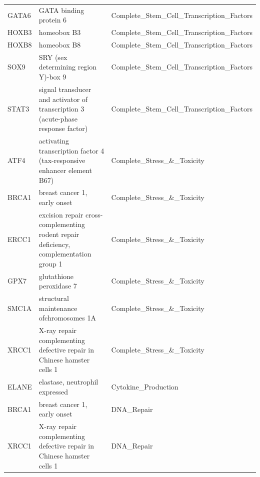 \documentclass[11pt]{article}
\begin{document}
\begin{table}[H]
{\begin{tabular}{|l|l|l|}
    GATA6  & GATA binding protein 6                                                                & Complete\_Stem\_Cell\_Transcription\_Factors \\
    HOXB3  & homeobox B3                                                                           & Complete\_Stem\_Cell\_Transcription\_Factors \\
    HOXB8  & homeobox B8                                                                           & Complete\_Stem\_Cell\_Transcription\_Factors \\
    SOX9   & SRY (sex determining region Y)-box 9                                                  & Complete\_Stem\_Cell\_Transcription\_Factors \\
    STAT3  & signal transducer and activator of transcription 3 (acute-phase response factor)      & Complete\_Stem\_Cell\_Transcription\_Factors \\
    ATF4   & activating transcription factor 4 (tax-responsive enhancer element B67)               & Complete\_Stress\_\&\_Toxicity           \\
    BRCA1  & breast cancer 1, early onset                                                          & Complete\_Stress\_\&\_Toxicity           \\
    ERCC1  & excision repair cross-complementing rodent repair deficiency, complementation group 1 & Complete\_Stress\_\&\_Toxicity           \\
    GPX7   & glutathione peroxidase 7                                                              & Complete\_Stress\_\&\_Toxicity           \\
    SMC1A  & structural maintenance ofchromosomes 1A                                               & Complete\_Stress\_\&\_Toxicity           \\
    XRCC1  & X-ray repair complementing defective repair in Chinese hamster cells 1                & Complete\_Stress\_\&\_Toxicity           \\
    ELANE  & elastase, neutrophil expressed                                                        & Cytokine\_Production                     \\
    BRCA1  & breast cancer 1, early onset                                                          & DNA\_Repair                              \\
    XRCC1  & X-ray repair complementing defective repair in Chinese hamster cells 1                & DNA\_Repair                              \\

\end{tabular}}
\end{table}
\end{document}
